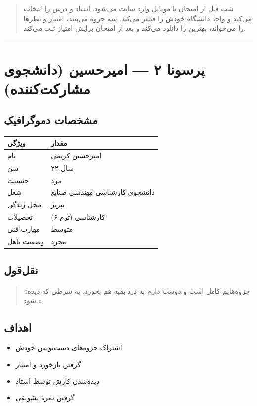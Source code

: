 \documentclass[12pt, a4paper]{article}
\begin{document}
\begin{quote}
شب قبل از امتحان با موبایل وارد سایت می‌شود. استاد و درس را انتخاب می‌کند
و واحد دانشگاه خودش را فیلتر می‌کند. سه جزوه می‌بیند، امتیاز و نظرها را می‌خواند،
بهترین را دانلود می‌کند و بعد از امتحان برایش امتیاز ثبت می‌کند.
\end{quote}

\begin{center}\rule{0.5\linewidth}{0.5pt}\end{center}

\section{پرسونا ۲ — امیرحسین (دانشجوی مشارکت‌کننده)}

\subsection{مشخصات دموگرافیک}

{\def\LTcaptype{none} %
\begin{longtable}[]{@{}ll@{}}
\toprule\noalign{}
ویژگی & مقدار \\
\midrule\noalign{}
\endhead
\bottomrule\noalign{}
\endlastfoot
نام & امیرحسین کریمی \\
سن & ۲۲ سال \\
جنسیت & مرد \\
شغل & دانشجوی کارشناسی مهندسی صنایع \\
محل زندگی & تبریز \\
تحصیلات & کارشناسی (ترم ۶) \\
مهارت فنی & متوسط \\
وضعیت تأهل & مجرد \\
\end{longtable}
}

\subsection{نقل‌قول}

\begin{quote}
«جزوه‌هایم کامل است و دوست دارم به درد بقیه هم بخورد، به شرطی که دیده شود.»
\end{quote}

\subsection{اهداف}

\begin{itemize}
\tightlist
\item
  اشتراک جزوه‌های دست‌نویس خودش
\item
  گرفتن بازخورد و امتیاز
\item
  دیده‌شدن کارش توسط استاد
\item
  گرفتن نمرهٔ تشویقی
\end{itemize}
\end{document}
